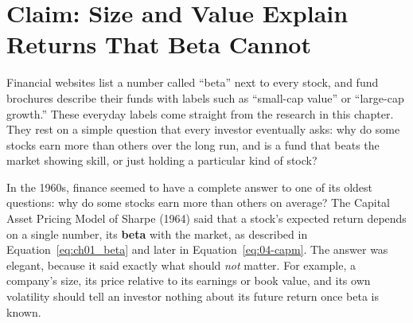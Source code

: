\makeatletter
{}
\makeatother

\chapter{Claim: Size and Value Explain Returns That Beta Cannot}
\label{ch:04}

Financial websites list a number called ``beta'' next to every stock, and fund brochures describe their funds with labels such as ``small-cap value'' or ``large-cap growth.'' These everyday labels come straight from the research in this chapter. They rest on a simple question that every investor eventually asks: why do some stocks earn more than others over the long run, and is a fund that beats the market showing skill, or just holding a particular kind of stock?

In the 1960s, finance seemed to have a complete answer to one of its oldest questions: why do some stocks earn more than others on average? The Capital Asset Pricing Model of Sharpe (1964) said that a stock's expected return depends on a single number, its \textbf{beta} with the market, as described in Equation~\ref{eq:ch01_beta} and later in Equation~\ref{eq:04-capm}. The answer was elegant, because it said exactly what should \emph{not} matter. For example, a company's size, its price relative to its earnings or book value, and its own volatility should tell an investor nothing about its future return once beta is known.

